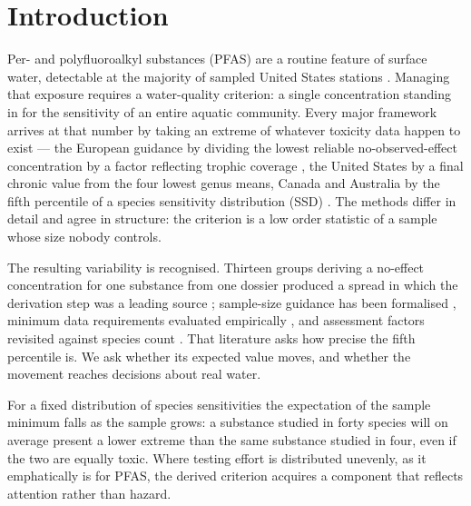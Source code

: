 \documentclass[preprint,12pt]{elsarticle}
\begin{document}
\linenumbers
\sloppy

\section{Introduction}

Per- and polyfluoroalkyl substances (PFAS) are a routine feature of surface
water, detectable at the majority of sampled United States stations
\cite{salvatore2023pfasoccur}. Managing that exposure requires a water-quality
criterion: a single concentration standing in for the sensitivity of an entire
aquatic community. Every major framework arrives at that number by taking an
extreme of whatever toxicity data happen to exist --- the European guidance by
dividing the lowest reliable no-observed-effect concentration by a factor
reflecting trophic coverage \cite{echa2008r10}, the United States by a final
chronic value from the four lowest genus means, Canada and Australia by the
fifth percentile of a species sensitivity distribution (SSD)
\cite{posthuma2019ssd}. The methods differ in detail and agree in structure:
the criterion is a low order statistic of a sample whose size nobody controls.

The resulting variability is recognised. Thirteen groups deriving a no-effect
concentration for one substance from one dossier produced a spread in which the
derivation step was a leading source \cite{hoondert2014pnecvar}; sample-size
guidance has been formalised \cite{belanger2019ssdsize}, minimum data
requirements evaluated empirically \cite{hiki2018mindata}, and assessment
factors revisited against species count \cite{iwasaki2022afssd}. That
literature asks how precise the fifth percentile is. We ask whether its
expected value moves, and whether the movement reaches decisions about real
water.

For a fixed distribution of species sensitivities the expectation of the sample
minimum falls as the sample grows: a substance studied in forty species will on
average present a lower extreme than the same substance studied in four, even
if the two are equally toxic. Where testing effort is distributed unevenly, as
it emphatically is for PFAS, the derived criterion acquires a component that
reflects attention rather than hazard.
\end{document}
